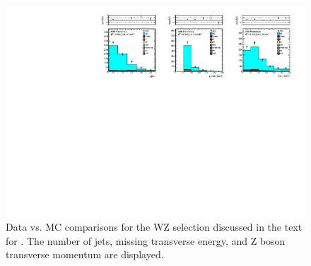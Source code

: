 \begin{figure}[tbh]
\begin{center}
\includegraphics[width=1\linewidth]{plots/WZ_19fb.pdf}
\caption{\label{fig:wz}\protect 
Data vs. MC comparisons for the WZ selection discussed in the text for \lumi. 
The number of jets, missing transverse energy, and Z boson transverse momentum are displayed.
}

\end{center}
\end{figure}


